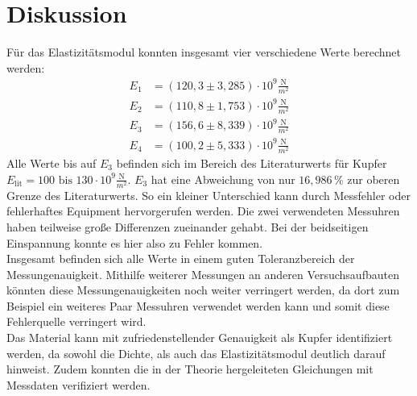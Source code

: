 \section{Diskussion}
\label{sec:Diskussion}
Für das Elastizitätsmodul konnten insgesamt vier verschiedene Werte berechnet werden:
\begin{align}
    E_1 &= (120{,}3 \pm 3{,}285) \cdot \mathrm{10^{9}} \frac{\mathrm{N}}{m^2} \\
    E_2 &= (110{,}8 \pm 1{,}753) \cdot \mathrm{10^{9}} \frac{\mathrm{N}}{m^2} \\
    E_3 &= (156{,}6 \pm 8{,}339) \cdot \mathrm{10^{9}} \frac{\mathrm{N}}{m^2} \\
    E_4 &= (100{,}2 \pm 5{,}333) \cdot \mathrm{10^{9}} \frac{\mathrm{N}}{m^2}
\end{align}
Alle Werte bis auf $E_3$ befinden sich im Bereich des Literaturwerts für Kupfer $E_{\mathrm{lit}} = 100 \text{ bis } 130 \cdot \mathrm{10^{9}} \frac{\mathrm{N}}{m^2}$\cite{Kupfer}.
$E_3$ hat eine Abweichung von nur $16,986 \, \%$ zur oberen Grenze des Literaturwerts. So ein kleiner Unterschied kann durch Messfehler oder fehlerhaftes Equipment
hervorgerufen werden. Die zwei verwendeten Messuhren haben teilweise große Differenzen zueinander gehabt. Bei der beidseitigen Einspannung konnte es hier also zu Fehler kommen.\\
Insgesamt befinden sich alle Werte in einem guten Toleranzbereich der Messungenauigkeit. Mithilfe weiterer Messungen an anderen Versuchsaufbauten könnten diese
Messungenauigkeiten noch weiter verringert werden, da dort zum Beispiel ein weiteres Paar Messuhren verwendet werden kann und somit diese Fehlerquelle verringert wird.\\
Das Material kann mit zufriedenstellender Genauigkeit als Kupfer identifiziert werden, da sowohl die Dichte, als auch das Elastizitätsmodul deutlich darauf hinweist. Zudem
konnten die in der Theorie hergeleiteten Gleichungen mit Messdaten verifiziert werden.

\newpage

